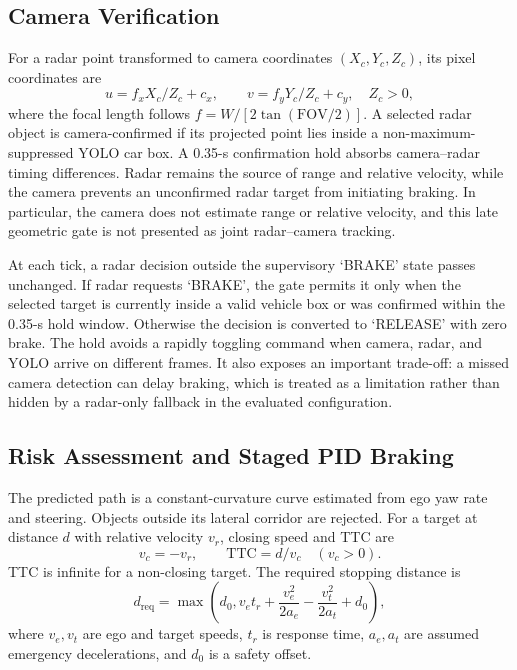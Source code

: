 \documentclass[conference]{IEEEtran}
\begin{document}
\subsection{Camera Verification}
For a radar point transformed to camera coordinates $(X_c,Y_c,Z_c)$, its pixel
coordinates are
\begin{equation}
 u=f_xX_c/Z_c+c_x,\qquad v=f_yY_c/Z_c+c_y, \quad Z_c>0,
 \label{eq:projection}
\end{equation}
where the focal length follows $f=W/[2\tan(\mathrm{FOV}/2)]$. A selected radar
object is camera-confirmed if its projected point lies inside a
non-maximum-suppressed YOLO car box. A 0.35-s confirmation hold absorbs
camera--radar timing differences. Radar remains the source of range and relative
velocity, while the camera prevents an unconfirmed radar target from initiating
braking. In particular, the camera does not estimate range or relative velocity,
and this late geometric gate is not presented as joint radar--camera tracking.

At each tick, a radar decision outside the supervisory `BRAKE' state passes
unchanged. If radar requests `BRAKE', the gate permits it only when the selected
target is currently inside a valid vehicle box or was confirmed within the
0.35-s hold window. Otherwise the decision is converted to `RELEASE' with zero
brake. The hold avoids a rapidly toggling command when camera, radar, and YOLO
arrive on different frames. It also exposes an important trade-off: a missed
camera detection can delay braking, which is treated as a limitation rather than
hidden by a radar-only fallback in the evaluated configuration.

\subsection{Risk Assessment and Staged PID Braking}
The predicted path is a constant-curvature curve estimated from ego yaw rate and
steering. Objects outside its lateral corridor are rejected. For a target at
distance $d$ with relative velocity $v_r$, closing speed and TTC are
\begin{equation}
 v_c=-v_r,\qquad \mathrm{TTC}=d/v_c \quad (v_c>0).
 \label{eq:ttc}
\end{equation}
TTC is infinite for a non-closing target. The required stopping distance is
\begin{equation}
 d_\mathrm{req}=\max\left(d_0,v_e t_r+\frac{v_e^2}{2a_e}
 -\frac{v_t^2}{2a_t}+d_0\right),
 \label{eq:stopping}
\end{equation}
where $v_e,v_t$ are ego and target speeds, $t_r$ is response time, $a_e,a_t$
are assumed emergency decelerations, and $d_0$ is a safety offset.
\end{document}
